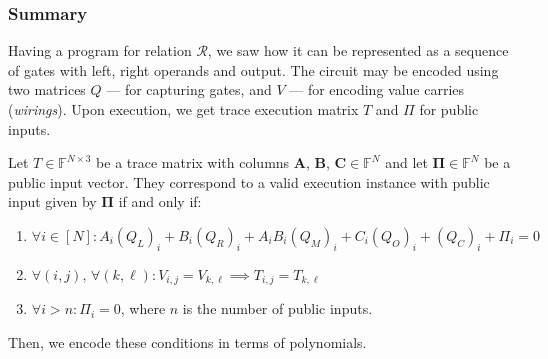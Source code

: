 \documentclass[../lecture-notes-148x210.tex]{subfiles}
\begin{document}
\subsubsection{Summary}
Having a program for relation $\mathcal{R}$, we saw how it can be represented as
a sequence of gates with left, right operands and output. The circuit may be
encoded using two matrices $Q$ --- for capturing gates, and $V$ --- for encoding
value carries (\textit{wirings}). Upon execution, we get trace execution matrix
$T$ and $\Pi$ for public inputs.

\begin{definition}
Let $T \in \mathbb{F}^{N \times 3}$ be a trace matrix with columns $\mathbf{A}$,
$\mathbf{B}$, $\mathbf{C} \in \mathbb{F}^N$ and let $\boldsymbol{\Pi} \in
\mathbb{F}^N$ be a public input vector. They correspond to a valid execution
instance with public input given by $\boldsymbol{\Pi}$ if and only if:
\begin{enumerate}
    \item \(\forall i \in [N]: A_i(Q_{L})_i + B_i(Q_{R})_i + A_iB_i(Q_{M})_i + C_i(Q_{O})_i + (Q_{C})_i + \Pi_i = 0\)
    \item \(\forall (i, j), \, \forall (k, \ell): V_{i,j} = V_{k,\ell} \implies T_{i,j} = T_{k,\ell}\)
    \item \(\forall i > n: \Pi_i = 0\), where $n$ is the number of public inputs.
\end{enumerate}
\end{definition}

Then, we encode these conditions in terms of polynomials.
\end{document}
